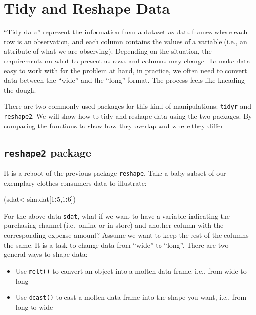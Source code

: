 \documentclass[12pt,]{krantz}
\makeatletter
\newenvironment{Shaded}{\begin{snugshade}}{\end{snugshade}}
\newcommand{\DecValTok}[1]{\textcolor[rgb]{0.06,0.06,0.06}{#1}}
\newcommand{\OperatorTok}[1]{\textcolor[rgb]{0.43,0.43,0.43}{\textbf{#1}}}
\newcommand{\NormalTok}[1]{#1}
\providecommand{\tightlist}{%
  \setlength{\itemsep}{0pt}\setlength{\parskip}{0pt}}
\newenvironment{kframe}{%
\medskip{}
\setlength{\fboxsep}{.8em}
 \def\at@end@of@kframe{}%
 \ifinner\ifhmode%
  \def\at@end@of@kframe{\end{minipage}}%
  \begin{minipage}{\columnwidth}%
 \fi\fi%
 \def\FrameCommand##1{\hskip\@totalleftmargin \hskip-\fboxsep
 \colorbox{shadecolor}{##1}\hskip-\fboxsep
     \hskip-\linewidth \hskip-\@totalleftmargin \hskip\columnwidth}%
 \MakeFramed {\advance\hsize-\width
   \@totalleftmargin\z@ \linewidth\hsize
   \@setminipage}}%
 {\par\unskip\endMakeFramed%
 \at@end@of@kframe}
\renewenvironment{Shaded}{\begin{kframe}}{\end{kframe}}
\theoremstyle{definition}
\theoremstyle{definition}
\theoremstyle{definition}
\theoremstyle{remark}
\makeatother
\begin{document}
\section{Tidy and Reshape Data}\label{tidy-and-reshape-data}

``Tidy data'' represent the information from a dataset as data frames
where each row is an observation, and each column contains the values of
a variable (i.e., an attribute of what we are observing). Depending on
the situation, the requirements on what to present as rows and columns
may change. To make data easy to work with for the problem at hand, in
practice, we often need to convert data between the ``wide'' and the
``long'' format. The process feels like kneading the dough.

There are two commonly used packages for this kind of manipulations:
\texttt{tidyr} and \texttt{reshape2}. We will show how to tidy and
reshape data using the two packages. By comparing the functions to show
how they overlap and where they differ.

\subsection{\texorpdfstring{\texttt{reshape2}
package}{reshape2 package}}\label{reshape2-package}

It is a reboot of the previous package \texttt{reshape}. Take a baby
subset of our exemplary clothes consumers data to illustrate:

\begin{Shaded}
\begin{Highlighting}[]
\NormalTok{(sdat<-sim.dat[}\DecValTok{1}\OperatorTok{:}\DecValTok{5}\NormalTok{,}\DecValTok{1}\OperatorTok{:}\DecValTok{6}\NormalTok{])}
\end{Highlighting}
\end{Shaded}

For the above data \texttt{sdat}, what if we want to have a variable
indicating the purchasing channel (i.e.~online or in-store) and another
column with the corresponding expense amount? Assume we want to keep the
rest of the columns the same. It is a task to change data from ``wide''
to ``long''. There are two general ways to shape data:

\begin{itemize}
\tightlist
\item
  Use \texttt{melt()} to convert an object into a molten data frame,
  i.e., from wide to long
\item
  Use \texttt{dcast()} to cast a molten data frame into the shape you
  want, i.e., from long to wide
\end{itemize}
\end{document}
